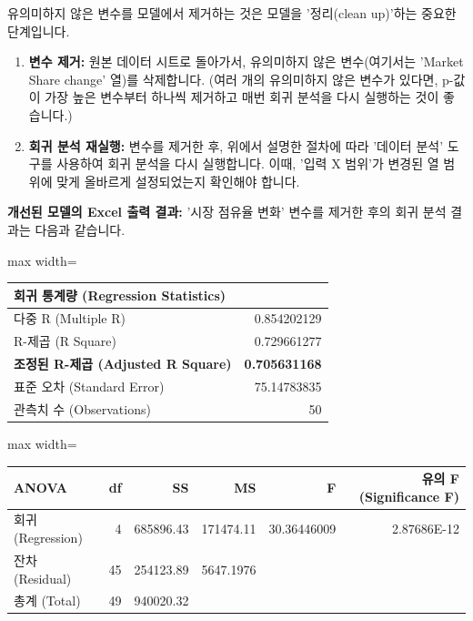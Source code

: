 \documentclass[11pt,a4paper]{article}
\begin{document}
\begin{tcolorbox}[title=\textbf{모델 정리: 유의미하지 않은 변수 제거}]
유의미하지 않은 변수를 모델에서 제거하는 것은 모델을 '정리(clean up)'하는 중요한 단계입니다.
\begin{enumerate}
    \item \textbf{변수 제거:} 원본 데이터 시트로 돌아가서, 유의미하지 않은 변수(여기서는 'Market Share change' 열)를 삭제합니다. (여러 개의 유의미하지 않은 변수가 있다면, p-값이 가장 높은 변수부터 하나씩 제거하고 매번 회귀 분석을 다시 실행하는 것이 좋습니다.)
    \item \textbf{회귀 분석 재실행:} 변수를 제거한 후, 위에서 설명한 절차에 따라 '데이터 분석' 도구를 사용하여 회귀 분석을 다시 실행합니다. 이때, '입력 X 범위'가 변경된 열 범위에 맞게 올바르게 설정되었는지 확인해야 합니다.
\end{enumerate}

\textbf{개선된 모델의 Excel 출력 결과:}
'시장 점유율 변화' 변수를 제거한 후의 회귀 분석 결과는 다음과 같습니다.

\begin{adjustbox}{max width=\textwidth}
\begin{tabular}{l r}
\toprule
\textbf{회귀 통계량 (Regression Statistics)} & \\
\midrule
다중 R (Multiple R) & 0.854202129 \\
R-제곱 (R Square) & 0.729661277 \\
\textbf{조정된 R-제곱 (Adjusted R Square)} & \textbf{0.705631168} \\
표준 오차 (Standard Error) & 75.14783835 \\
관측치 수 (Observations) & 50 \\
\bottomrule
\end{tabular}
\end{adjustbox}

\vspace{0.5em}

\begin{adjustbox}{max width=\textwidth}
\begin{tabular}{l r r r r r}
\toprule
\textbf{ANOVA} & \textbf{df} & \textbf{SS} & \textbf{MS} & \textbf{F} & \textbf{유의 F (Significance F)} \\
\midrule
회귀 (Regression) & 4 & 685896.43 & 171474.11 & 30.36446009 & 2.87686E-12 \\
잔차 (Residual) & 45 & 254123.89 & 5647.1976 & & \\
총계 (Total) & 49 & 940020.32 & & & \\
\bottomrule
\end{tabular}
\end{adjustbox}


\end{tcolorbox}
\end{document}
